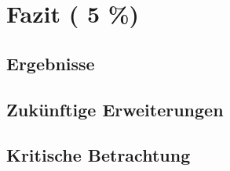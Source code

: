 \chapter{Fazit ( 5 \%)}
\section{Ergebnisse}
\section{Zukünftige Erweiterungen}
\section{Kritische Betrachtung}
